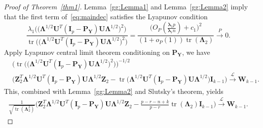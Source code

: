 \documentclass[12pt]{article} %
\DeclareMathOperator{\mytr}{tr}
\newcommand{\bZ}{\mathbf{Z}}
\newcommand{\bP}{\mathbf{P}}
\newcommand{\bY}{\mathbf{Y}}
\newcommand{\bI}{\mathbf{I}}
\newcommand{\bU}{\mathbf{U}}
\newcommand{\bW}{\mathbf{W}}
\newcommand{\bfsym}[1]{\ensuremath{\boldsymbol{#1}}}
\def\blambda {\bfsym {\lambda}}
\def\bLambda {\bfsym {\Lambda}}
\theoremstyle{definition}
\begin{document}
\begin{appendices}
\begin{proof}[\textrm{Proof of Theorem~\ref{thm1}}]
    Lemma~\eqref{gg:Lemma1} and Lemma~\eqref{gg:Lemma2} imply that the first term of~\eqref{eq:maindec} satisfies the Lyapunov condition
$$
    \frac{\lambda_1\Big(\big(\bLambda^{1/2} \bU^T (\bI_p-\bP_{\bY})\bU \bLambda^{1/2}\big)^2\Big)}{\mytr \Big( \big(\bLambda^{1/2} \bU^T (\bI_p-\bP_{\bY})\bU \bLambda^{1/2}\big)^2\Big)}
=
\frac{
\big( O_P(\frac{\blambda_1 p}{\blambda_r n})+c_1\big)^2
}{
    (1+o_P(1))\mytr(\bLambda_2)
}
\xrightarrow{P} 0.
$$
Apply Lyapunov central limit theorem conditioning on $\bP_{\bY}$, we have
$$
\begin{aligned}
    &\Big(\mytr \Big(\big(\bLambda^{1/2} \bU^T (\bI_p-\bP_{\bY})\bU \bLambda^{1/2}\big)^2\Big) \Big)^{-1/2}\\
    &\big( \bZ_2^T \bLambda^{1/2}\bU^T (\bI_p-\bP_{\bY})\bU\bLambda^{1/2}\bZ_2
    -\mytr\big(\bLambda^{1/2} \bU^T (\bI_p-\bP_{\bY})\bU \bLambda^{1/2}\big)
     \bI_{k-1} \big)
\xrightarrow{\mathcal{L}} \bW_{k-1}.
\end{aligned}
$$
    This, combined with Lemma~\ref{gg:Lemma2} and Slutsky's theorem, yields
$$
\begin{aligned}
    \frac{1}{\sqrt{\mytr(\bLambda_2^2)}}
    \big( \bZ_2^T \bLambda^{1/2} \bU^T (\bI_p-\bP_{\bY})\bU\bLambda^{1/2}\bZ_2
    -\tfrac{p-r-n+k}{p-r}\mytr(\bLambda_2)\bI_{k-1} \big)
\xrightarrow{\mathcal{L}} \bW_{k-1}.
\end{aligned}
$$


\end{proof}
\end{appendices}
\end{document}
